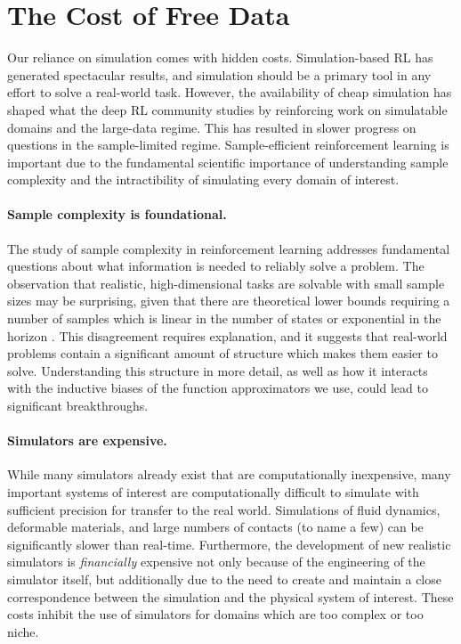 \section{The Cost of Free Data}

Our reliance on simulation comes with hidden costs.
Simulation-based RL has generated spectacular results, and simulation should be a primary tool in any effort to solve a real-world task.
However, the availability of cheap simulation has shaped what the deep RL community studies by reinforcing work on simulatable domains and the large-data regime.
This has resulted in slower progress on questions in the sample-limited regime.
Sample-efficient reinforcement learning is important due to the fundamental scientific importance of understanding sample complexity and the intractibility of simulating every domain of interest.


\paragraph{Sample complexity is foundational.}
The study of sample complexity in reinforcement learning addresses fundamental questions about what information is needed to reliably solve a problem.
The observation that realistic, high-dimensional tasks are solvable with small sample sizes may be surprising, given that there are theoretical lower bounds requiring a number of samples which is linear in the number of states or exponential in the horizon \citep{Du2020IsAG}.
This disagreement requires explanation, and it suggests that real-world problems contain a significant amount of structure which makes them easier to solve.
Understanding this structure in more detail, as well as how it interacts with the inductive biases of the function approximators we use, could lead to significant breakthroughs.


\paragraph{Simulators are expensive.}
While many simulators already exist that are computationally inexpensive, many important systems of interest are computationally difficult to simulate with sufficient precision for transfer to the real world.
Simulations of fluid dynamics, deformable materials, and large numbers of contacts (to name a few) can be significantly slower than real-time.
Furthermore, the development of new realistic simulators is \emph{financially} expensive not only because of the engineering of the simulator itself, but additionally due to the need to create and maintain a close correspondence between the simulation and the physical system of interest.
These costs inhibit the use of simulators for domains which are too complex or too niche.

